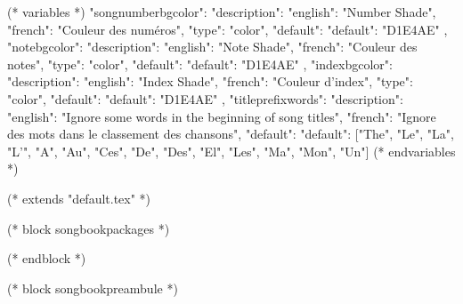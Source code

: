 

(* variables *)
{
"songnumberbgcolor": {"description": {"english": "Number Shade", "french": "Couleur des numéros"},
                     "type": "color",
                     "default": {"default": "D1E4AE"}
                  },
"notebgcolor": {"description": {"english": "Note Shade", "french": "Couleur des notes"},
               "type": "color",
               "default": {"default": "D1E4AE"}
            },
"indexbgcolor": {"description": {"english": "Index Shade", "french": "Couleur d'index"},
               "type": "color",
               "default": {"default": "D1E4AE"}
            },
"titleprefixwords": {"description": {"english": "Ignore some words in the beginning of song titles",
                                     "french": "Ignore des mots dans le classement des chansons"},
                     "default": {"default": ["The", "Le", "La", "L'", "A", "Au", "Ces", "De",
                     						 "Des", "El", "Les", "Ma", "Mon", "Un"]}
                     }
}
(* endvariables *)

(* extends "default.tex" *)

(* block songbookpackages *)
\usepackage[((booktype)),
            (* for option in bookoptions *)((option)),
            (* endfor *)
            (* for instrument in instruments *)((instrument)),
            (* endfor *)]{crepbook}
(* endblock *)

(* block songbookpreambule *)
   \usepackage[
     a4paper %
     ,includeheadfoot %
     ,hmarginratio=1:1 %
     ,outer=1.8cm %
     ,vmarginratio=1:1 %
     ,bmargin=1.3cm %
     ]{geometry}

